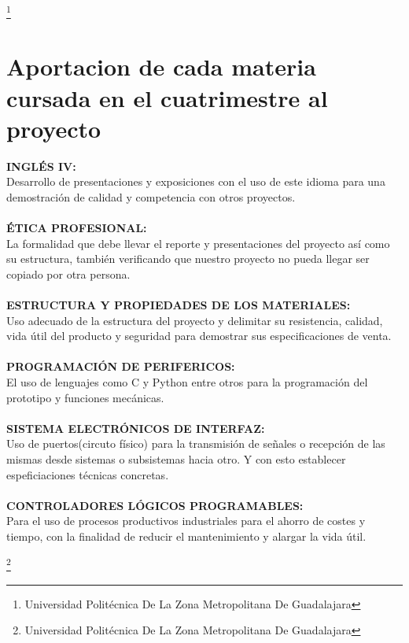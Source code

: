 \documentclass[11pt,a4paper]{article}
\begin{document}
 \footnote{Universidad Politécnica De La Zona Metropolitana De Guadalajara} 
\newpage

\section{Aportacion de cada materia cursada en el cuatrimestre al proyecto}
\textbf{INGLÉS IV:}\\ Desarrollo de presentaciones y exposiciones con el uso de este idioma para una demostración de calidad y competencia con otros proyectos.\\\\
\textbf{ÉTICA PROFESIONAL:}\\ La formalidad que debe llevar el reporte y presentaciones del proyecto así como su estructura, también verificando que nuestro proyecto no pueda llegar ser copiado por otra persona.\\\\
\textbf{ESTRUCTURA Y PROPIEDADES DE LOS MATERIALES:}\\ Uso adecuado de la estructura del proyecto y delimitar su resistencia, calidad, vida útil del producto y seguridad para demostrar sus especificaciones de venta.\\\\
\textbf{PROGRAMACIÓN DE PERIFERICOS:}\\ El uso de lenguajes como C y Python entre otros para la programación del prototipo y funciones mecánicas.\\\\
\textbf{SISTEMA ELECTRÓNICOS DE INTERFAZ:}\\ Uso de puertos(circuto físico) para la transmisión de señales o recepción de las mismas desde sistemas o subsistemas hacia otro. Y con esto establecer espeficiaciones técnicas concretas.\\\\
\textbf{CONTROLADORES LÓGICOS PROGRAMABLES:}\\ Para el uso de procesos productivos industriales para el ahorro de costes y tiempo, con la finalidad de reducir el mantenimiento y alargar la vida útil.

 \footnote{Universidad Politécnica De La Zona Metropolitana De Guadalajara} 
\newpage
\end{document}
